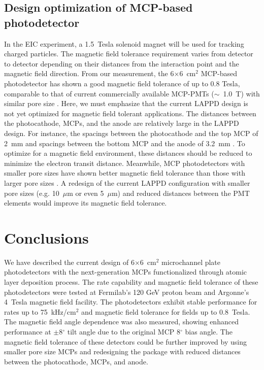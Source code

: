 \documentclass[preprint,5p]{elsarticle}
\begin{document}
\subsection{Design optimization of MCP-based photodetector}\label{subsec_opt}
In the EIC experiment, a 1.5~Tesla solenoid magnet will be used for tracking 
charged particles. The magnetic field tolerance requirement varies from 
detector to detector depending on their distances from the interaction point 
and the magnetic field direction. From our measurement, the 6$\times$6~cm$^2$ 
MCP-based photodetector has shown a good magnetic field tolerance of up to 0.8 
Tesla, comparable to that of current commercially available MCP-PMTs 
($\sim$~1.0~T) with similar pore size \cite{MCPs-B}. Here, we must emphasize 
that the current LAPPD design is not yet optimized for magnetic field tolerant 
applications. The distances between the photocathode, MCPs, and the anode are 
relatively large in the LAPPD design. For instance, the spacings between the 
photocathode and the top MCP of 2~mm and spacings between the bottom MCP and 
the anode of 3.2~mm \cite{Wang-MCPs}. To optimize for a magnetic field 
environment, these distances should be reduced to minimize the electron transit 
distance. Meanwhile, MCP photodetectors with smaller pore sizes have shown 
better magnetic field tolerance than those with larger pore sizes
\cite{MCPs-B, Lehmann, Ilieva}. A redesign of the current LAPPD configuration 
with smaller pore sizes (e.g.  10~$\mu$m or even 5~$\mu$m) and reduced 
distances between the PMT elements would improve its magnetic field tolerance. 

\section{Conclusions}
We have described the current design of 6$\times$6~cm$^2$ microchannel plate 
photodetectors with the next-generation MCPs functionalized through atomic 
layer deposition process. The rate capability and magnetic field tolerance of 
these photodetectors were tested at Fermilab's 120 GeV proton beam and 
Argonne's 4~Tesla magnetic field facility. The photodetectors exhibit stable 
performance for rates up to 75~kHz/cm$^2$ and magnetic field tolerance for 
fields up to 0.8~Tesla. The magnetic field angle dependence was also measured, 
showing enhanced performance at $\pm$8$^{\circ}$ tilt angle due to the original 
MCP 8$^{\circ}$ bias angle. The magnetic field tolerance of these detectors 
could be further improved by using smaller pore size MCPs and redesigning the 
package with reduced distances between the photocathode, MCPs, and anode.
 
\end{document}
